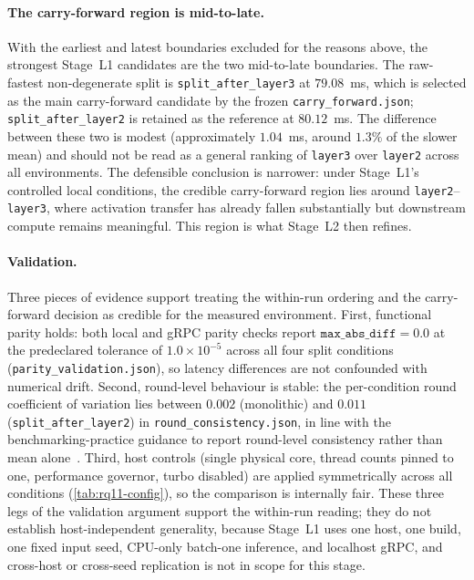 \paragraph{The carry-forward region is mid-to-late.}
With the earliest and latest boundaries excluded for the reasons
above, the strongest Stage~L1 candidates are the two mid-to-late
boundaries. The raw-fastest non-degenerate split is
\texttt{split\_after\_layer3} at \(79.08\)~ms, which is selected as
the main carry-forward candidate by the frozen
\texttt{carry\_forward.json}; \texttt{split\_after\_layer2} is
retained as the reference at \(80.12\)~ms. The difference between
these two is modest (approximately \(1.04\)~ms, around \(1.3\%\) of
the slower mean) and should not be read as a general ranking of
\texttt{layer3} over \texttt{layer2} across all environments. The
defensible conclusion is narrower: under Stage~L1's controlled local
conditions, the credible carry-forward region lies around
\texttt{layer2}--\texttt{layer3}, where activation transfer has
already fallen substantially but downstream compute remains
meaningful. This region is what Stage~L2 then refines.

\paragraph{Validation.}
Three pieces of evidence support treating the within-run ordering and
the carry-forward decision as credible for the measured environment.
First, functional parity holds: both local and gRPC parity checks
report \(\texttt{max\_abs\_diff} = 0.0\) at the predeclared tolerance
of \(1.0\times10^{-5}\) across all four split conditions
(\texttt{parity\_validation.json}), so latency differences are not
confounded with numerical drift. Second, round-level behaviour is
stable: the per-condition round coefficient of variation lies between
\(0.002\) (monolithic) and \(0.011\) (\texttt{split\_after\_layer2})
in \texttt{round\_consistency.json}, in line with the
benchmarking-practice guidance to report round-level consistency
rather than mean alone~\cite{benchmarking_sc15}. Third, host controls
(single physical core, thread counts pinned to one, performance
governor, turbo disabled) are applied symmetrically across all
conditions (\cref{tab:rq11-config}), so the comparison is internally
fair. These three legs of the validation argument support the
within-run reading; they do not establish host-independent generality,
because Stage~L1 uses one host, one build, one fixed input seed, CPU-only
batch-one inference, and localhost gRPC, and cross-host or cross-seed
replication is not in scope for this stage.


